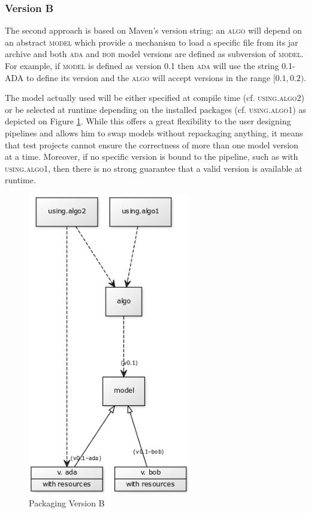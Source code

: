 \documentclass{article}
\newcommand{\id}[1]{\mbox{\textsc{#1}}}
\begin{document}
\subsubsection{Version B}

The second approach is based on Maven's version string: an \id{algo} will depend on an abstract \id{model} which provide a mechanism to load a specific file from its jar archive and both \id{ada} and \id{bob} model versions are defined as subversion of \id{model}. For example, if \id{model} is defined as version \id{0.1} then \id{ada} will use the string \id{0.1-ADA} to define its version and the \id{algo} will accept versions in the range $ [0.1,0.2) $.

The model actually used will be either specified at compile time (cf. \id{using.algo2}) or be selected at runtime depending on the installed packages (cf. \id{using.algo1}) as depicted on Figure \ref{fig:pkgsysB}. While this offers a great flexibility to the user designing pipelines and allows him to swap models without repackaging anything, it means that test projects cannot ensure the correctness of more than one model version at a time. Moreover, if no specific version is bound to the pipeline, such as with \id{using.algo1}, then there is no strong guarantee that a valid version is available at runtime.

\begin{figure}
\centering
\includegraphics[width=200pt]{res/packaging_version_B.png}
\caption{Packaging Version B}
\label{fig:pkgsysB}
\end{figure}
\end{document}
